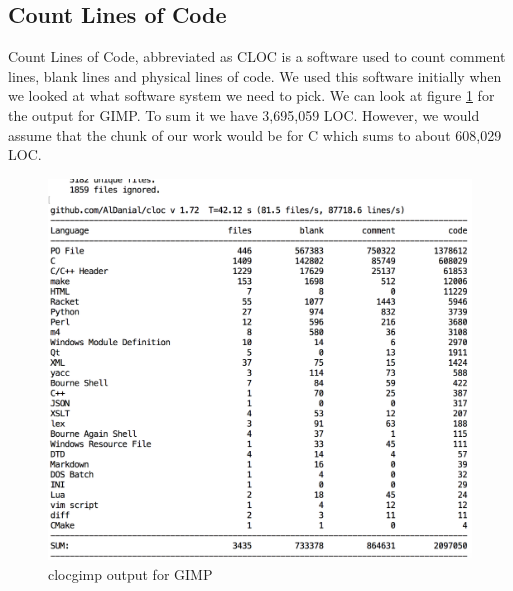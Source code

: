 \subsection{Count Lines of Code}
Count Lines of Code\cite{cloc}, abbreviated as CLOC is a software used to count comment lines, blank lines and physical lines of code. We used this software initially when we looked at what software system we need to pick. We can look at figure \ref{fig:clocgimp output for GIMP}  for the output for GIMP. To sum it we have 3,695,059 LOC. However, we would assume that the chunk of our work would be for C which sums to about 608,029 LOC.  
\begin{figure}[h]
	\centering
	\includegraphics[width=0.7\linewidth, height=0.4\textheight]{clocgimp}
	\caption{clocgimp output for GIMP}
	\label{fig:clocgimp output for GIMP}
\end{figure}

